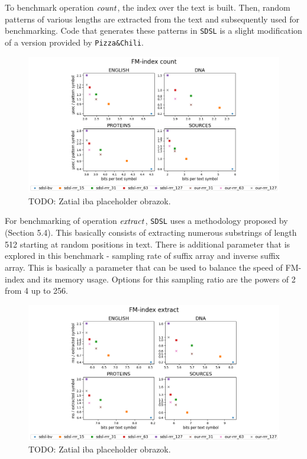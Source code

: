 To benchmark operation $\mathit{count}$, the index over the text is built. Then, random patterns of
various lengths are extracted from the text and subsequently used for benchmarking. Code
that generates these patterns in \texttt{SDSL} is a slight modification of a version provided
by \texttt{Pizza\&Chili}.

\begin{figure}
	\centerline{
		\includegraphics[width=\textwidth, height=0.7\textheight]{images/vysledky_sdsl_count}
	}
	\caption[TODO]{TODO: Zatial iba placeholder obrazok.
	}
	\label{obr:benchmark_sdsl_count}
\end{figure}

For benchmarking of operation $\mathit{extract}$, \texttt{SDSL} uses a methodology proposed by
\cite{ferragina2009compressed} (Section 5.4). This basically consists of extracting numerous
substrings of length 512 starting at random positions in text. There is additional parameter
that is explored in this benchmark - sampling rate of suffix array and inverse suffix array.
This is basically a parameter that can be used to balance the speed of FM-index and its memory
usage. Options for this sampling ratio are the powers of 2 from 4 up to 256. 

\begin{figure}
	\centerline{
		\includegraphics[width=\textwidth, height=0.7\textheight]{images/vysledky_sdsl_extract}
	}
	\caption[TODO]{TODO: Zatial iba placeholder obrazok.
	}
	\label{obr:benchmark_sdsl_extract}
\end{figure}


